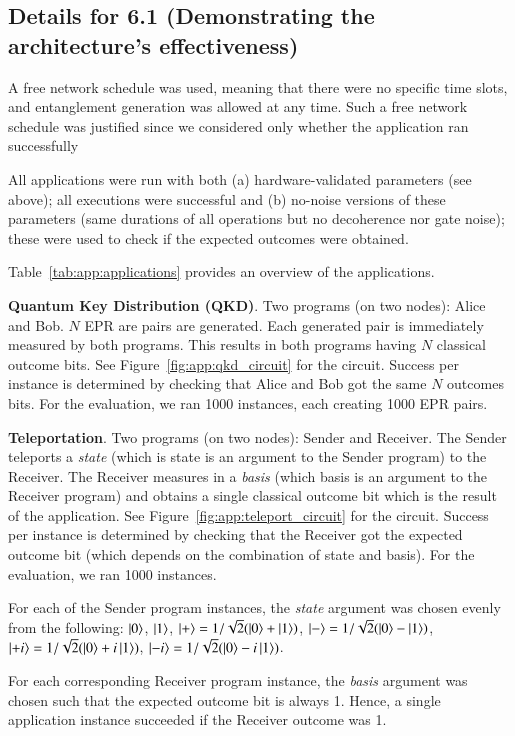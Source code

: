 \subsection{Details for 6.1 (Demonstrating the architecture's effectiveness)}
\label{qoala:sec:app:details_6_1}
A free network schedule was used, meaning that there were no specific time slots, and entanglement generation was allowed at any time.
Such a free network schedule was justified since we considered only whether the application ran successfully

All applications were run with both (a) hardware-validated parameters (see above); all executions were successful and (b) no-noise versions of these parameters (same durations of all operations but no decoherence nor gate noise); these were used to check if the expected outcomes were obtained.

Table~\ref{tab:app:applications} provides an overview of the applications.

\textbf{Quantum Key Distribution (QKD)}. 
Two programs (on two nodes): Alice and Bob. $N$ EPR are pairs are generated. Each generated pair is immediately measured by both programs.
This results in both programs having $N$ classical outcome bits.
See Figure~\ref{fig:app:qkd_circuit} for the circuit.
Success per instance is determined by checking that Alice and Bob got the same $N$ outcomes bits.
For the evaluation, we ran 1000 instances, each creating 1000 EPR pairs.

\textbf{Teleportation}.
Two programs (on two nodes): Sender and Receiver. The Sender teleports a \textit{state} (which is state is an argument to the Sender program) to the Receiver.
The Receiver measures in a \textit{basis} (which basis is an argument to the Receiver program) and obtains a single classical outcome bit which is the result of the application.
See Figure~\ref{fig:app:teleport_circuit} for the circuit.
Success per instance is determined by checking that the Receiver got the expected outcome bit (which depends on the combination of state and basis).
For the evaluation, we ran 1000 instances.

For each of the Sender program instances, the \textit{state} argument was chosen evenly from the following:
$\ket{0}$,
$\ket{1}$,
$\ket{+} = 1/\sqrt{2} (\ket{0} + \ket{1})$,
$\ket{-} = 1/\sqrt{2} (\ket{0} - \ket{1})$,
$\ket{+i} = 1/\sqrt{2} (\ket{0} + i \ket{1})$,
$\ket{-i} = 1/\sqrt{2} (\ket{0} - i \ket{1})$.

For each corresponding Receiver program instance, the \textit{basis} argument was chosen such that the expected outcome bit is always 1.
Hence, a single application instance succeeded if the Receiver outcome was 1.


